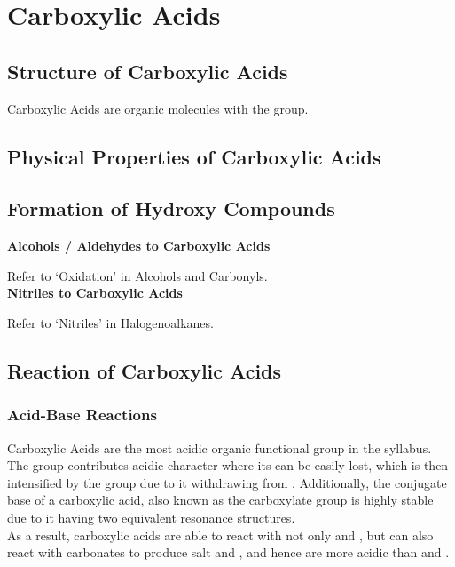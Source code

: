 \documentclass[../main]{subfiles}
\begin{document}
\section{Carboxylic Acids}

	\subsection{Structure of Carboxylic Acids}

	Carboxylic Acids are organic molecules with the  group.

	\subsection{Physical Properties of Carboxylic Acids}

	

	\subsection{Formation of Hydroxy Compounds}

	\noindent \textbf{Alcohols / Aldehydes to Carboxylic Acids}

	Refer to `Oxidation' in Alcohols and Carbonyls. \\

	\noindent \textbf{Nitriles to Carboxylic Acids}

	Refer to `Nitriles' in Halogenoalkanes. \\ 

	\subsection{Reaction of Carboxylic Acids}

	\subsubsection{Acid-Base Reactions}

	Carboxylic Acids are the most acidic organic functional group in the syllabus. The  group contributes acidic character where its  can be easily lost, which is then intensified by the  group due to it withdrawing  from . Additionally, the conjugate base of a carboxylic acid, also known as the carboxylate group  is highly stable due to it having two equivalent resonance structures. \\

	As a result, carboxylic acids are able to react with not only  and , but can also react with carbonates to produce salt and , and hence are more acidic than  and . \\
\end{document}
